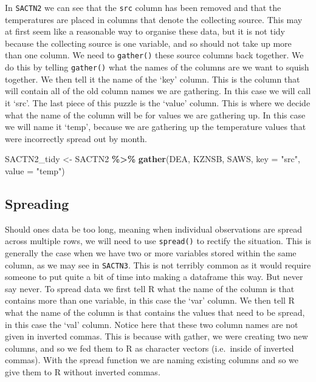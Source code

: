 \documentclass[
]{book}
\newenvironment{Shaded}{\begin{snugshade}}{\end{snugshade}}
\newcommand{\DataTypeTok}[1]{\textcolor[rgb]{0.13,0.29,0.53}{#1}}
\newcommand{\KeywordTok}[1]{\textcolor[rgb]{0.13,0.29,0.53}{\textbf{#1}}}
\newcommand{\NormalTok}[1]{#1}
\newcommand{\OperatorTok}[1]{\textcolor[rgb]{0.81,0.36,0.00}{\textbf{#1}}}
\newcommand{\StringTok}[1]{\textcolor[rgb]{0.31,0.60,0.02}{#1}}
\begin{document}
In \texttt{SACTN2} we can see that the \texttt{src} column has been removed and that the temperatures are placed in columns that denote the collecting source. This may at first seem like a reasonable way to organise these data, but it is not tidy because the collecting source is one variable, and so should not take up more than one column. We need to \texttt{gather()} these source columns back together. We do this by telling \texttt{gather()} what the names of the columns are we want to squish together. We then tell it the name of the `key' column. This is the column that will contain all of the old column names we are gathering. In this case we will call it `src'. The last piece of this puzzle is the `value' column. This is where we decide what the name of the column will be for values we are gathering up. In this case we will name it `temp', because we are gathering up the temperature values that were incorrectly spread out by month.

\begin{Shaded}
\begin{Highlighting}[]
\NormalTok{SACTN2\_tidy <{-}}\StringTok{ }\NormalTok{SACTN2 }\OperatorTok{\%>\%}
\StringTok{  }\KeywordTok{gather}\NormalTok{(DEA, KZNSB, SAWS, }\DataTypeTok{key =} \StringTok{"src"}\NormalTok{, }\DataTypeTok{value =} \StringTok{"temp"}\NormalTok{)}
\end{Highlighting}
\end{Shaded}

\hypertarget{spreading}{%
\subsection{Spreading}\label{spreading}}

Should ones data be too long, meaning when individual observations are spread across multiple rows, we will need to use \texttt{spread()} to rectify the situation. This is generally the case when we have two or more variables stored within the same column, as we may see in \texttt{SACTN3}. This is not terribly common as it would require someone to put quite a bit of time into making a dataframe this way. But never say never. To spread data we first tell R what the name of the column is that contains more than one variable, in this case the `var' column. We then tell R what the name of the column is that contains the values that need to be spread, in this case the `val' column. Notice here that these two column names are not given in inverted commas. This is because with gather, we were creating two new columns, and so we fed them to R as character vectors (i.e.~inside of inverted commas). With the spread function we are naming existing columns and so we give them to R without inverted commas.
\end{document}
